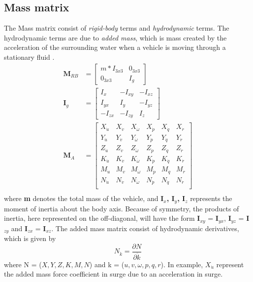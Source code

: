 \subsection{Mass matrix}
The Mass matrix consist of \textit{rigid-body} terms and \textit{hydrodynamic} terms. The hydrodynamic terms are due to \textit{added mass}, which is mass created by the acceleration of the surrounding water when a vehicle is moving through a stationary fluid \cite{Fossen}. 
\begin{align}
    \textbf{M}_{RB} & = \begin{bmatrix}
                m*I_{3x3} & 0_{3x3}\\
                0_{3x3} & I_{g}
                \end{bmatrix} \\
    \mathbf{I}_{g} & = \begin{bmatrix}
                I_{x} & -I_{xy} & -I_{xz} \\
                I_{yx} & I_{y} & -I_{yz} \\
                -I_{zx} & -I_{zy} & I_{z}
                \end{bmatrix} \\
    \textbf{M}_{A} & = \begin{bmatrix}
                X_{\Dot{u}} & X_{\Dot{v}} & X_{\Dot{\omega}} & X_{\Dot{p}} & X_{\Dot{q}} & X_{\Dot{r}} \\
                Y_{\Dot{u}} & Y_{\Dot{v}} & Y_{\Dot{\omega}} & Y_{\Dot{p}} & Y_{\Dot{q}} & Y_{\Dot{r}} \\
                Z_{\Dot{u}} & Z_{\Dot{v}} & Z_{\Dot{\omega}} & Z_{\Dot{p}} & Z_{\Dot{q}} & Z_{\Dot{r}} \\
                K_{\Dot{u}} & K_{\Dot{v}} & K_{\Dot{\omega}} & K_{\Dot{p}} & K_{\Dot{q}} & K_{\Dot{r}} \\
                M_{\Dot{u}} & M_{\Dot{v}} & M_{\Dot{\omega}} & M_{\Dot{p}} & M_{\Dot{q}} & M_{\Dot{r}} \\
                N_{\Dot{u}} & N_{\Dot{v}} & N_{\Dot{\omega}} & N_{\Dot{p}} & N_{\Dot{q}} & N_{\Dot{r}} \\
                \end{bmatrix} \\
\end{align}
where \textbf{m} denotes the total mass of the vehicle, and \textbf{I$_{x}$, I$_{y}$, I$_{z}$} represents the moment of inertia about the body axis. Because of symmetry, the products of inertia, here represented on the off-diagonal, will have the form \textbf{I$_{xy}$} = \textbf{I$_{yx}$}, \textbf{I$_{yz}$} = \textbf{I$_{zy}$} and \textbf{I$_{zx}$} = \textbf{I$_{xz}$}. The added mass matrix consist of hydrodynamic derivatives, which is given by
\begin{equation}
N_{\Dot{k}} = \frac{\partial N}{\partial \Dot{k}}
\end{equation}
where N = ($X, Y, Z, K, M, N$) and k = ($u, v, \omega, p, q, r$). In example, $X_{\Dot{u}}$ represent the added mass force coefficient in surge due to an acceleration in surge.
